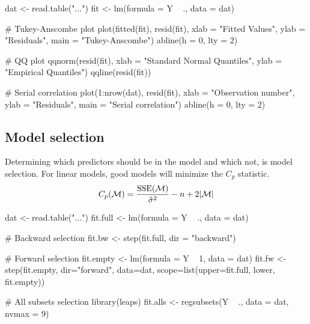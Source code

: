 \begin{code}
 dat <- read.table("...")
 fit <- lm(formula = Y ~ ., data = dat)
 
 # Tukey-Anscombe plot
 plot(fitted(fit), resid(fit), xlab = "Fitted Values", ylab = "Residuals", main = "Tukey-Anscombe")
 abline(h = 0, lty = 2)
 
 # QQ plot
 qqnorm(resid(fit), xlab = "Standard Normal Quantiles", ylab = "Empirical Quantiles")
 qqline(resid(fit))
 
 # Serial correlation
 plot(1:nrow(dat), resid(fit), xlab = "Observation number", ylab = "Residuals", main = "Serial correlation")
 abline(h = 0, lty = 2) 
\end{code}

\subsection{Model selection}
\begin{theory}
 Determining which predictors should be in the model and which not, is model selection. For linear models, good models will minimize the $C_p$ statistic.
 \begin{equation*}
  C_p(\mathcal{M}) = \frac{\operatorname{SSE}(\mathcal{M})}{\hat{\sigma}^2} - n + 2 |\mathcal{M}|
 \end{equation*}
\end{theory}

\begin{code}
 dat <- read.table("...")
 fit.full <- lm(formula = Y ~ ., data = dat)
 
 # Backward selection
 fit.bw <- step(fit.full, dir = "backward")
 
 # Forward selection
 fit.empty <- lm(formula = Y ~ 1, data = dat)
 fit.fw <- step(fit.empty, dir="forward", data=dat, scope=list(upper=fit.full, lower, fit.empty))

 # All subsets selection
 library(leaps)
 fit.alls <- regsubsets(Y ~ ., data = dat, nvmax = 9) 
\end{code}
